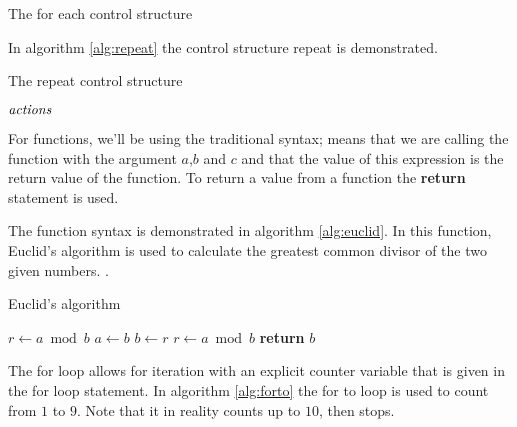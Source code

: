 \begin{algorithm}[H]
  \caption{The for each control structure}
  \label{alg:for-each}
  \begin{algorithmic}[1]
    \EndForEach
  \end{algorithmic}
\end{algorithm}

In algorithm \ref{alg:repeat} the control structure repeat is
demonstrated.

\begin{algorithm}[H]
  \caption{The repeat control structure}
  \label{alg:repeat}
  \begin{algorithmic}[1]
    \State $\mathit{actions}$ 
    \EndRepeatn
  \end{algorithmic}
\end{algorithm}

For functions, we'll be using the traditional syntax;
 means that we are calling the function
 with the argument $a$,$b$ and $c$ and that the value
of this expression is the return value of the function. To return a
value from a function the \textbf{return} statement is used.

The function syntax is demonstrated in algorithm \ref{alg:euclid}. In
this function, Euclid's algorithm is used to calculate the greatest
common divisor of the two given numbers.
\cite{cormen2009introduction_to_algo,weisstein:_euclid_algor}.

\begin{algorithm}
  \caption{Euclid's algorithm}
  \label{alg:euclid}
  \begin{algorithmic}[1]
    \State $r\gets a\bmod b$
    \State $a\gets b$
    \State $b\gets r$
    \State $r\gets a\bmod b$
    \EndWhile
    \State \textbf{return} $b$
    \EndProcedure
  \end{algorithmic}
\end{algorithm}

The for loop allows for iteration with an explicit counter variable
that is given in the for loop statement. In algorithm \ref{alg:forto}
the for to loop is used to count from $1$ to $9$. Note that it in
reality counts up to $10$, then stops.

